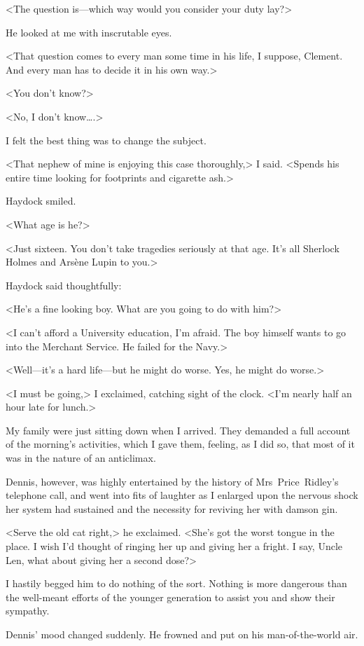 <The question is—which way would you consider your duty lay?>

He looked at me with inscrutable eyes.

<That question comes to every man some time in his life, I suppose, Clement. And every man has to decide it in his own way.>

<You don't know?>

<No, I don't know\dots.>

I felt the best thing was to change the subject.

<That nephew of mine is enjoying this case thoroughly,> I said. <Spends his entire time looking for footprints and cigarette ash.>

Haydock smiled.

<What age is he?>

<Just sixteen. You don't take tragedies seriously at that age. It's all Sherlock Holmes and Arsène Lupin to you.>

Haydock said thoughtfully:

<He's a fine looking boy. What are you going to do with him?>

<I can't afford a University education, I'm afraid. The boy himself wants to go into the Merchant Service. He failed for the Navy.>

<Well—it's a hard life—but he might do worse. Yes, he might do worse.>

<I must be going,> I exclaimed, catching sight of the clock. <I'm nearly half an hour late for lunch.>

My family were just sitting down when I arrived. They demanded a full account of the morning's activities, which I gave them, feeling, as I did so, that most of it was in the nature of an anticlimax.

Dennis, however, was highly entertained by the history of Mrs~Price~Ridley's telephone call, and went into fits of laughter as I enlarged upon the nervous shock her system had sustained and the necessity for reviving her with damson gin.

<Serve the old cat right,> he exclaimed. <She's got the worst tongue in the place. I wish I'd thought of ringing her up and giving her a fright. I say, Uncle Len, what about giving her a second dose?>

I hastily begged him to do nothing of the sort. Nothing is more dangerous than the well-meant efforts of the younger generation to assist you and show their sympathy.

Dennis' mood changed suddenly. He frowned and put on his man-of-the-world air.

